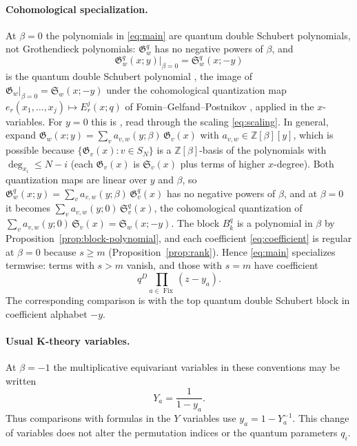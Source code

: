 \documentclass[11pt]{article}
\newcommand{\G}{\mathfrak{G}}
\newcommand{\Fix}{\operatorname{Fix}}
\begin{document}
\paragraph{Cohomological specialization.}
At $\beta=0$ the polynomials in \eqref{eq:main} are quantum double
Schubert polynomials, not Grothendieck polynomials: $\G^q_w$ has no
negative powers of $\beta$, and
\[
 \G^q_w(x;y)\big|_{\beta=0}=\mathfrak S^q_w(x;-y)
\]
is the quantum double Schubert polynomial \cite{kirillov2000quantum},
the image of $\G_w|_{\beta=0}=\mathfrak S_w(x;-y)$ under the
cohomological quantization map
$e_r(x_1,\ldots,x_j)\mapsto E^j_r(x;q)$ of Fomin--Gelfand--Postnikov
\cite{fomin1997quantum}, applied in the $x$-variables. For $y=0$ this
is \cite[Proposition~3.22]{lenart2006quantum}, read through the
scaling \eqref{eq:scaling}. In general, expand
$\G_w(x;y)=\sum_va_{v,w}(y;\beta)\,\G_v(x)$ with
$a_{v,w}\in\mathbb Z[\beta][y]$, which is possible because
$\{\G_v(x):v\in S_N\}$ is a $\mathbb Z[\beta]$-basis of the
polynomials with $\deg_{x_i}\leq N-i$ (each $\G_v(x)$ is
$\mathfrak S_v(x)$ plus terms of higher $x$-degree). Both quantization
maps are linear over $y$ and $\beta$, so
$\G^q_w(x;y)=\sum_va_{v,w}(y;\beta)\,\G^q_v(x)$ has no negative powers
of $\beta$, and at $\beta=0$ it becomes
$\sum_va_{v,w}(y;0)\,\mathfrak S^q_v(x)$, the cohomological
quantization of $\sum_va_{v,w}(y;0)\,\mathfrak S_v(x)=\mathfrak S_w(x;-y)$.
The block $B^q_k$ is a polynomial in $\beta$ by
Proposition~\ref{prop:block-polynomial}, and each coefficient
\eqref{eq:coefficient} is regular at $\beta=0$ because $s\geq m$
(Proposition~\ref{prop:rank}). Hence \eqref{eq:main} specializes
termwise: terms with $s>m$ vanish, and those with $s=m$ have
coefficient
\[
 q^D\prod_{a\in\Fix}(z-y_a).
\]
The corresponding comparison is with the top quantum double
Schubert block in coefficient alphabet $-y$.

\paragraph{Usual K-theory variables.}
At $\beta=-1$ the multiplicative equivariant variables in these
conventions may be written
\[
 Y_a=\frac1{1-y_a}.
\]
Thus comparisons with formulas in the $Y$ variables use
$y_a=1-Y_a^{-1}$. This change of variables does not alter the
permutation indices or the quantum parameters $q_i$.



\end{document}
